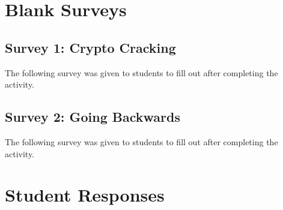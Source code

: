 \providecommand{\heading}[1]{\section{#1}}
\providecommand{\subheading}[1]{\subsection{#1}}

\heading{Blank Surveys}\label{sec:blank-surveys}
\subheading{Survey 1: Crypto Cracking}\label{subsec:blank-surveys-cc}
    The following survey was given to students to fill out after completing the  activity.


\subheading{{Survey 2: Going Backwards}}\label{subsec:blank-surveys-gb}
    The following survey was given to students to fill out after completing the  activity.



\heading{Student Responses}